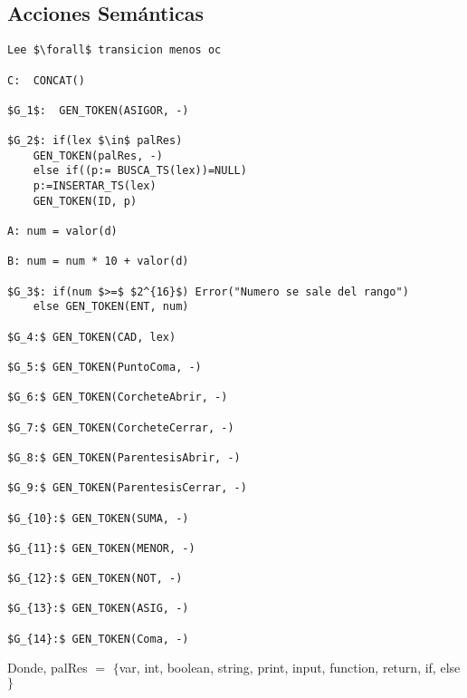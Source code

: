 \documentclass[a4paper, 12pt]{article}
\begin{document}
\newpage
\subsection{Acciones Semánticas}
\lstset{
  basicstyle=\mdseries,
  xleftmargin=3em,
  mathescape=true
}

\begin{lstlisting}
Lee $\forall$ transicion menos oc

C:  CONCAT()

$G_1$:  GEN_TOKEN(ASIGOR, -)

$G_2$: if(lex $\in$ palRes)
	GEN_TOKEN(palRes, -)
    else if((p:= BUSCA_TS(lex))=NULL)
	p:=INSERTAR_TS(lex)
	GEN_TOKEN(ID, p)

A: num = valor(d)

B: num = num * 10 + valor(d)

$G_3$: if(num $>=$ $2^{16}$) Error("Numero se sale del rango")
    else GEN_TOKEN(ENT, num)

$G_4:$ GEN_TOKEN(CAD, lex)

$G_5:$ GEN_TOKEN(PuntoComa, -)

$G_6:$ GEN_TOKEN(CorcheteAbrir, -)

$G_7:$ GEN_TOKEN(CorcheteCerrar, -)

$G_8:$ GEN_TOKEN(ParentesisAbrir, -)

$G_9:$ GEN_TOKEN(ParentesisCerrar, -)

$G_{10}:$ GEN_TOKEN(SUMA, -)

$G_{11}:$ GEN_TOKEN(MENOR, -)

$G_{12}:$ GEN_TOKEN(NOT, -)

$G_{13}:$ GEN_TOKEN(ASIG, -)

$G_{14}:$ GEN_TOKEN(Coma, -)	
\end{lstlisting}
Donde, palRes $=$ $\{$var, int, boolean, string, print, input, function, return, if, else$\}$
\newline
\end{document}
